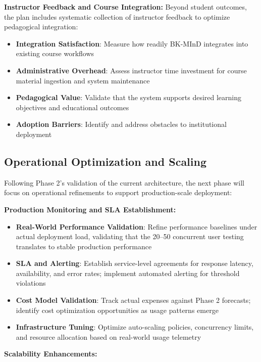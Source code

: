 \textbf{Instructor Feedback and Course Integration:} Beyond student outcomes, the plan includes systematic collection of instructor feedback to optimize pedagogical integration:

\begin{itemize}
    \item \textbf{Integration Satisfaction}: Measure how readily BK-MInD integrates into existing course workflows
    \item \textbf{Administrative Overhead}: Assess instructor time investment for course material ingestion and system maintenance
    \item \textbf{Pedagogical Value}: Validate that the system supports desired learning objectives and educational outcomes
    \item \textbf{Adoption Barriers}: Identify and address obstacles to institutional deployment
\end{itemize}

\subsection{Operational Optimization and Scaling}

Following Phase 2's validation of the current architecture, the next phase will focus on operational refinements to support production-scale deployment:

\textbf{Production Monitoring and SLA Establishment:}

\begin{itemize}
    \item \textbf{Real-World Performance Validation}: Refine performance baselines under actual deployment load, validating that the 20--50 concurrent user testing translates to stable production performance
    \item \textbf{SLA and Alerting}: Establish service-level agreements for response latency, availability, and error rates; implement automated alerting for threshold violations
    \item \textbf{Cost Model Validation}: Track actual expenses against Phase 2 forecasts; identify cost optimization opportunities as usage patterns emerge
    \item \textbf{Infrastructure Tuning}: Optimize auto-scaling policies, concurrency limits, and resource allocation based on real-world usage telemetry
\end{itemize}

\textbf{Scalability Enhancements:}

